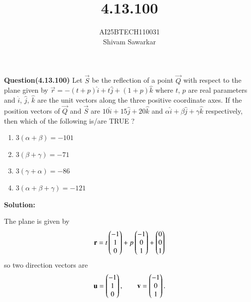 \documentclass[journal]{IEEEtran}
\begin{document}

\vspace{3cm}

\title{4.13.100}
\author{AI25BTECH110031 \\ Shivam Sawarkar}
 \maketitle
{\let\newpage\relax\maketitle}

\renewcommand{\thefigure}{\theenumi}
\renewcommand{\thetable}{\theenumi}
\setlength{\intextsep}{10pt} %


\renewcommand{\thetable}{\theenumi}

\textbf{Question(4.13.100)} Let $\vec{S}$ be the reflection of a point $\vec{Q}$ with respect to the plane given by $\vec{r}=-(t+p)\hat{i}+t\hat{j}+(1+p)\hat{k}$ where $t$, $p$ are real parameters and $\hat{i}$, $\hat{j}$, $\hat{k}$ are the unit vectors along the three positive coordinate axes. If the position vectors of $\vec{Q}$ and $\vec{S}$ are $10\hat{i}+15\hat{j}+20\hat{k}$ and $\alpha\hat{i}+\beta\hat{j}+\gamma\hat{k}$ respectively, then which of the following is/are TRUE ? \\ 
\begin{enumerate}[label=\alph*]
    \item $3(\alpha+\beta) = -101$
    \item $3(\beta+\gamma) = -71$
    \item $3(\gamma+\alpha) = -86$
    \item $3(\alpha+\beta+\gamma) = -121$
\end{enumerate}
\textbf{Solution:}

The plane is given by 
\begin{align}
\mathbf{r} = t\begin{pmatrix}-1 \\ 1 \\ 0\end{pmatrix}+p\begin{pmatrix}-1 \\ 0 \\ 1\end{pmatrix}+\begin{pmatrix}0 \\ 0 \\ 1\end{pmatrix}
\end{align} 
so two direction vectors are
\begin{align}
\mathbf{u} = \begin{pmatrix}-1\\1\\0\end{pmatrix}, 
\qquad 
\mathbf{v} = \begin{pmatrix}-1\\0\\1\end{pmatrix}.
\end{align}
\end{document}
